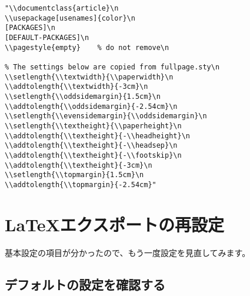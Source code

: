 \documentclass[dvipdfmx,12pt]{jsarticle}
\begin{document}
\lstset{language=Lisp,label= ,caption= ,numbers=none}
\begin{lstlisting}
"\\documentclass{article}\n
\\usepackage[usenames]{color}\n
[PACKAGES]\n
[DEFAULT-PACKAGES]\n
\\pagestyle{empty}    % do not remove\n

% The settings below are copied from fullpage.sty\n
\\setlength{\\textwidth}{\\paperwidth}\n
\\addtolength{\\textwidth}{-3cm}\n
\\setlength{\\oddsidemargin}{1.5cm}\n
\\addtolength{\\oddsidemargin}{-2.54cm}\n
\\setlength{\\evensidemargin}{\\oddsidemargin}\n
\\setlength{\\textheight}{\\paperheight}\n
\\addtolength{\\textheight}{-\\headheight}\n
\\addtolength{\\textheight}{-\\headsep}\n
\\addtolength{\\textheight}{-\\footskip}\n
\\addtolength{\\textheight}{-3cm}\n
\\setlength{\\topmargin}{1.5cm}\n
\\addtolength{\\topmargin}{-2.54cm}"
\end{lstlisting}
\section{\LaTeX{}エクスポートの再設定}
\label{sec-4}

基本設定の項目が分かったので、もう一度設定を見直してみます。

\subsection{デフォルトの設定を確認する}
\label{sec-4-1}
\end{document}
